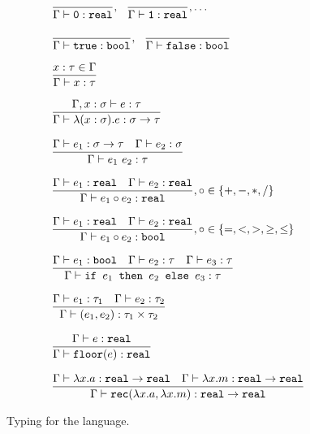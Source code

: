 \begin{figure}
\[
\begin{array}{lr}
\dfrac{}{\Gamma \vdash \texttt{0}: \texttt{real}}, \ \ \dfrac{}{\Gamma \vdash \texttt{1}: \texttt{real}}, \ldots \\ \\
\dfrac{}{\Gamma \vdash \texttt{true} : \texttt{bool}}, \ \ \dfrac{}{\Gamma \vdash \texttt{false} : \texttt{bool}} \\  \\
\dfrac{x : \tau \in \Gamma}{\Gamma \vdash x : \tau } \\ \\ 
\dfrac{\Gamma, x : \sigma \vdash e : \tau}{\Gamma \vdash \lambda (x : \sigma).e : \sigma \rightarrow \tau } \\ \\
\dfrac{\Gamma \vdash e_1: \sigma \rightarrow \tau \ \ \ \Gamma \vdash e_2 : \sigma}{\Gamma \vdash e_1 \ e_2 : \tau} \\ \\
\dfrac{\Gamma \vdash e_1 : \texttt{real} \ \ \ \Gamma \vdash e_2 : \texttt{real}}{\Gamma \vdash e_1 \circ e_2 : \texttt{real}}
, \circ \in \{+,-,*,/\} \\ \\ 
\dfrac{\Gamma \vdash e_1 : \texttt{real} \ \ \ \Gamma \vdash e_2 : \texttt{real}}{\Gamma \vdash e_1 \circ e_2 : \texttt{bool}}
, \circ \in \{=, <, >, \geq, \leq\} \\ \\ 
\dfrac{\Gamma \vdash e_1 : \texttt{bool} \ \ \ \Gamma \vdash e_2 : \tau \ \ \ \Gamma \vdash e_3 : \tau}
{\Gamma \vdash \ifelse{e_1}{e_2}{e_3} : \tau} \\ \\ 
\dfrac{\Gamma \vdash e_1 : \tau_1 \ \ \ \Gamma \vdash e_2 : \tau_2}{\Gamma \vdash (e_1, e_2) : \tau_1 \times \tau_2} \\ \\
\dfrac{\Gamma \vdash e : \texttt{real}}{\Gamma \vdash \texttt{floor}(e) : \texttt{real}} \\ \\
\dfrac{\Gamma \vdash \lambda x.a : \texttt{real} \rightarrow \texttt{real} \ \ \ \Gamma \vdash \lambda x.m : 
\texttt{real} \rightarrow \texttt{real}} 
{\Gamma \vdash \texttt{rec}(\lambda x.a, \lambda x.m) : \texttt{real} \rightarrow \texttt{real}} 
\end{array}
\]
\caption{Typing for the language.}
\label{fig:sum-typing}
\end{figure}

